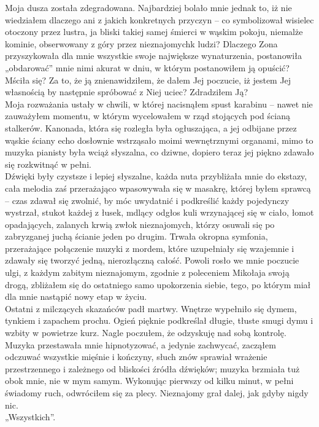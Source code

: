 \documentclass[../MAIN.tex]{subfiles}
\begin{document}
Moja dusza została zdegradowana. Najbardziej bolało mnie jednak to, iż nie wiedziałem dlaczego ani z jakich konkretnych przyczyn -- co symbolizował wisielec otoczony przez lustra, ja bliski takiej samej śmierci w wąskim pokoju, niemalże kominie, obserwowany z góry przez nieznajomych\3k ludzi? Dlaczego Zona przyszykowała dla mnie wszystkie swoje największe wynaturzenia, postanowiła „obdarować” mnie nimi akurat w dniu, w którym postanowiłem ją opuścić? Mściła się? Za to, że ją znienawidziłem, że dałem Jej poczucie, iż jestem Jej własnością by następnie spróbować z Niej uciec? Zdradziłem Ją?\\
Moja rozważania ustały w chwili, w której nacisnąłem spust karabinu -- nawet nie zauważyłem momentu, w którym wycelowałem w rząd stojących pod ścianą stalkerów. Kanonada, która się rozległa była ogłuszająca, a jej odbijane przez wąskie ściany echo dosłownie wstrząsało moimi wewnętrznymi organami, mimo to muzyka pianisty była wciąż słyszalna, co dziwne, dopiero teraz jej piękno zdawało się rozkwitnąć w pełni.\\
Dźwięki były czystsze i lepiej słyszalne, każda nuta przybliżała mnie do ekstazy, cała melodia zaś przerażająco wpasowywała się w masakrę, której byłem sprawcą -- czas zdawał się zwolnić, by móc uwydatnić i podkreślić każdy pojedynczy wystrzał, stukot każdej z łusek, mdlący odgłos kuli wrzynającej się w ciało, łomot opadających, zalanych krwią zwłok nieznajomych, którzy osuwali się po zabryzganej juchą ścianie jeden po drugim. Trwała okropna symfonia, przerażające połączenie muzyki z mordem, które uzupełniały się wzajemnie i zdawały się tworzyć jedną, nierozłączną całość. Powoli rosło we mnie poczucie ulgi, z każdym zabitym nieznajomym, zgodnie z poleceniem Mikołaja swoją drogą, zbliżałem się do ostatniego samo upokorzenia siebie, tego, po którym miał dla mnie nastąpić nowy etap w życiu.\\
Ostatni z milczących skazańców padł martwy. Wnętrze wypełniło się dymem, tynkiem i zapachem prochu. Ogień pięknie podkreślał długie, tłuste smugi dymu i wzbity w powietrze kurz. Nagle poczułem, że odzyskuję nad sobą kontrolę. Muzyka przestawała mnie hipnotyzować, a jedynie zachwycać, zacząłem odczuwać wszystkie mięśnie i kończyny, słuch znów sprawiał wrażenie przestrzennego i zależnego od bliskości źródła dźwięków; muzyka brzmiała tuż obok mnie, nie w mym samym. Wykonując pierwszy od kilku minut, w pełni świadomy ruch, odwróciłem się za plecy. Nieznajomy grał dalej, jak gdyby nigdy nic.\\
„Wszystkich”.\\
\end{document}
